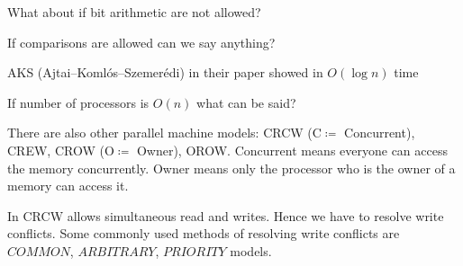 \begin{question}
	What about if bit arithmetic are not allowed?
\end{question}
\begin{question}
	If comparisons are allowed can we say anything?
\end{question}
\begin{answer}
	AKS (Ajtai–Koml\'{o}s–Szemer\'{e}di) in their paper \cite{akssortparallel} showed in $O(\log n)$ time
\end{answer}

\begin{question}
	If number of processors is $O(n)$ what can be said?
\end{question}
There are also other parallel machine models: CRCW (C$\coloneqq$ Concurrent), CREW, CROW (O$\coloneqq$ Owner), OROW. Concurrent means everyone can access the memory concurrently. Owner means only the processor who is the owner of a memory can access it. 

In CRCW allows simultaneous read and writes. Hence we have to resolve write conflicts. Some commonly used methods of resolving write conflicts are $COMMON$, $ARBITRARY$, $PRIORITY$ models.  


